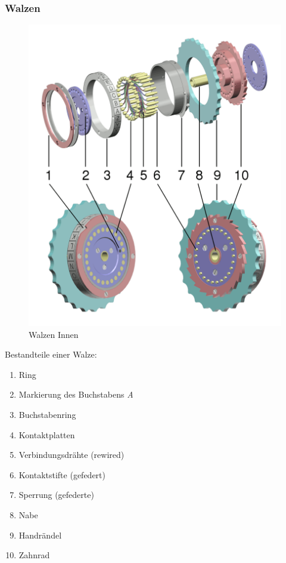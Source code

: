 \subsubsection{Walzen}
\label{sec:rader}
\begin{figure}
\includegraphics[scale=0.15]{Enigma_rotor_exploded_view.png}
\caption{Walzen Innen}
\label{fig:rotorex}
\end{figure}
Bestandteile einer Walze:
\begin{enumerate}
\item Ring
\item Markierung des Buchstabens \emph{A}
\item Buchstabenring
\item Kontaktplatten
\item Verbindungsdrähte (rewired)
\item Kontaktstifte (gefedert)
\item Sperrung (gefederte)
\item Nabe
\item Handrändel
\item Zahnrad
\end{enumerate}

